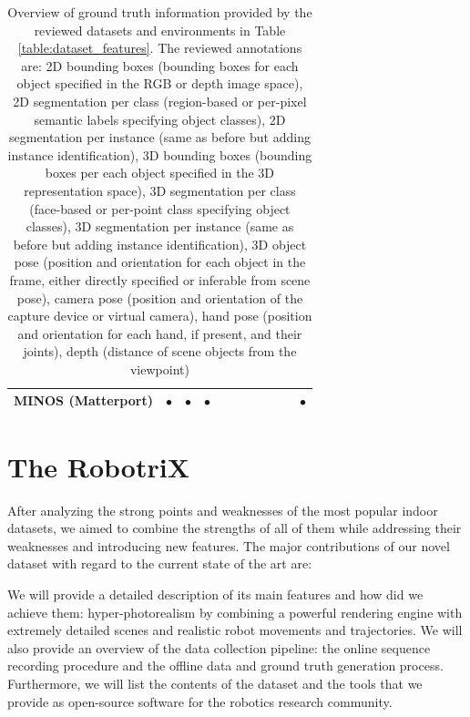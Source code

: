 \begin{table}[!t]
{\begin{tabular}{|r|c|c|c|c|c|c|c|c|c|c|}
      MINOS (Matterport) \cite{Savva2017} & $\bullet$ & $\bullet$ & $\bullet$ & & & & & & & $\bullet$ \\
      \hline
    \end{tabular}}
    \smallskip
    \caption{Overview of ground truth information provided by the reviewed datasets and environments in Table \ref{table:dataset_features}. The reviewed annotations are: 2D bounding boxes (bounding boxes for each object specified in the RGB or depth image space), 2D segmentation per class (region-based or per-pixel semantic labels specifying object classes), 2D segmentation per instance (same as before but adding instance identification), 3D bounding boxes (bounding boxes per each object specified in the 3D representation space), 3D segmentation per class (face-based or per-point class specifying object classes), 3D segmentation per instance (same as before but adding instance identification), 3D object pose (position and orientation for each object in the frame, either directly specified or inferable from scene pose), camera pose (position and orientation of the capture device or virtual camera), hand pose (position and orientation for each hand, if present, and their joints), depth (distance of scene objects from the viewpoint)}
    \label{table:dataset_ground_truth}
  \end{table}

\clearpage

\section{The RobotriX}
\label{cha:sim2real:sec:proposal}

After analyzing the strong points and weaknesses of the most popular indoor datasets, we aimed to combine the strengths of all of them while addressing their weaknesses and introducing new features. The major contributions of our novel dataset with regard to the current state of the art are:



We will provide a detailed description of its main features and how did we achieve them: hyper-photorealism by combining a powerful rendering engine with extremely detailed scenes and realistic robot movements and trajectories. We will also provide an overview of the data collection pipeline: the online sequence recording procedure and the offline data and ground truth generation process. Furthermore, we will list the contents of the dataset and the tools that we provide as open-source software for the robotics research community.

